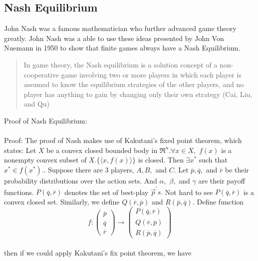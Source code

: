\documentclass[12pt]{article}
\begin{document}
	\subsection{Nash Equilibrium}
	 John Nash was a famous mathematician who further advanced game theory greatly. John Nash was a able to use these ideas presented by John Von Nuemann in 1950 to show that finite games always have a Nash Equilibrium. 
	 \begin{quotation}
		In game theory, the Nash equilibrium is a solution concept of a non-cooperative game involving two or more players in which each player is assumed to know the equilibrium strategies of the other players, and no player has anything to gain by changing only their own strategy (Cai, Liu, and Qu)
 	\end{quotation}
 	Proof of Nash Equilibrium:\\
 	\\
 	Proof: The proof of Nash makes use of Kakutani's fixed point theorem, which states: Let $X$ be a convex closed bounded body in $\Re ^ { n } . \forall x \in X ,$
 	$f ( x )$ is a nonempty convex subset of $X . \{ \langle x , f ( x ) \rangle \}$ is closed. Then $\exists x ^ { * }$ such that $x ^ { * } \in f \left( x ^ { * } \right) .$. Suppose there are 3
 	players, $A , B ,$ and $C .$ Let $\overline { p } , \overline { q } ,$ and $\overline { r }$ be their probability distributions over the action sets. And $\alpha ,$
 	$\beta ,$ and $\gamma$ are their payoff functions. $P ( \overline { q } , \overline { r } )$ denotes the set of best-play $\vec { p } ^ { \prime } s .$ Not hard to see $P ( \overline { q } , \overline { r } )$
 	is a convex closed set. Similarly, we define
 	 $Q ( \overline { r } , \overline { p } )$ and
 	  $R ( \overline { p } , \overline { q } ) .$ 
 	  Define function\[f : \left( \begin{array} { c } { \overline { p } } \\ { \overline { q } } \\ { \overline { r } } \end{array} \right) \rightarrow \left( \begin{array} { c } { P ( \overline { q } , \overline { r } ) } \\ { Q ( \overline { r } , \overline { p } ) } \\ { R ( \overline { p } , \overline { q } ) } \end{array} \right)\]
 	\\
 	then if we could apply Kakutani's fix point theorem, we have\\
\end{document}
